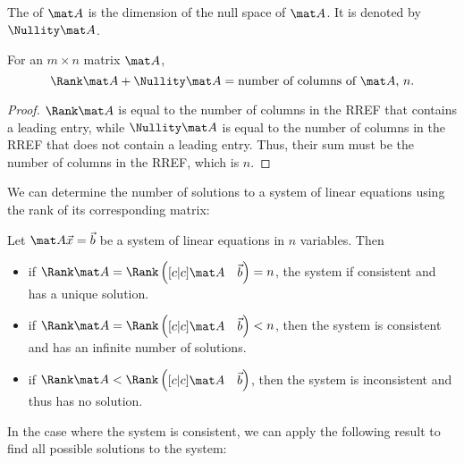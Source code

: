 \begin{definition}
    The  of $\mat A$ is the dimension of the null space of $\mat A$. It is denoted by $\Nullity \mat A$.
\end{definition}

\begin{theorem}
    For an $m \times n$ matrix $\mat A$, \[\Rank \mat A + \Nullity \mat A = \text{number of columns of $\mat A$, } n.\]
\end{theorem}
\begin{proof}
    $\Rank \mat A$ is equal to the number of columns in the RREF that contains a leading entry, while $\Nullity \mat A$ is equal to the number of columns in the RREF that does not contain a leading entry. Thus, their sum must be the number of columns in the RREF, which is $n$.
\end{proof}

We can determine the number of solutions to a system of linear equations using the rank of its corresponding matrix:

\begin{recipe}
    Let $\mat A \vec x = \vec b$ be a system of linear equations in $n$ variables. Then
    \begin{itemize}
        \item if $\Rank \mat A = \Rank \begin{pmatrix}[c|c] \mat A & \vec b\end{pmatrix} = n$, the system if consistent and has a unique solution.
        \item if $\Rank \mat A = \Rank \begin{pmatrix}[c|c] \mat A & \vec b\end{pmatrix} < n$, then the system is consistent and has an infinite number of solutions.
        \item if $\Rank \mat A < \Rank \begin{pmatrix}[c|c] \mat A & \vec b\end{pmatrix}$, then the system is inconsistent and thus has no solution.
    \end{itemize}
\end{recipe}

In the case where the system is consistent, we can apply the following result to find all possible solutions to the system:

